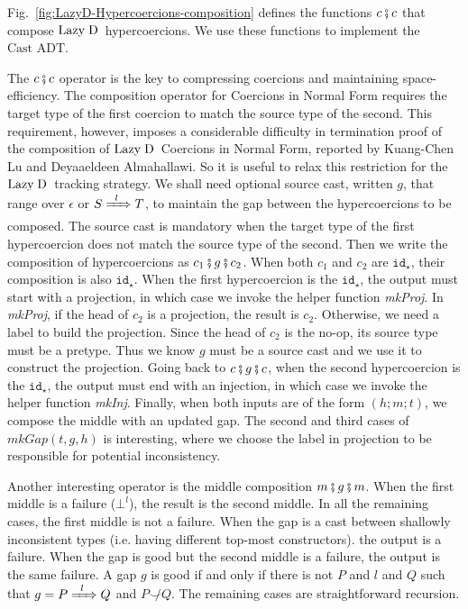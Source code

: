 \documentclass[runningheads]{llncs}
\newcommand{\figref}[1]{Fig.~\ref{#1}}
\newcommand{\LD}{\ensuremath{\text{Lazy\;D}}}
\newcommand{\CastADT}{\ensuremath{\text{Cast ADT}}}
\newcommand{\Tdyn}[0]{\ensuremath{\star}}
\newcommand{\ccast}[3]{#1 \xRightarrow[]{\enskip #2 \enskip} #3}
\newcommand{\cnfid}[1]{\ensuremath{\mathtt{id}_{#1}}}
\newcommand{\hcci}[0]{\cnfid{\Tdyn}}
\newcommand{\hccc}[3]{\ensuremath{(#1;#2;#3)}}
\newcommand{\hcmfail}[1]{\ensuremath{\bot^l}}
\newcommand{\gnone}{\ensuremath{\epsilon}}
\newcommand{\gsome}[3]{\ccast{#1}{#2}{#3}}
\newcommand{\composegap}[3]{\ensuremath{#1 \fatsemi #2 \fatsemi #3}}
\newcommand{\mkgap}[3]{\ensuremath{\mathit{mkGap}(#1,#2,#3)}}
\newcommand{\compose}[2]{\ensuremath{#1 \fatsemi #2}}
\newcommand{\notshallowlyconsistent}[2]{\ensuremath{#1\not\smile#2}}
\begin{document}
\figref{fig:LazyD-Hypercoercions-composition} defines the functions 
\compose{c}{c} that compose \LD\ hypercoercions. We use these functions to 
implement the \CastADT.


The \compose{c}{c} operator is the key to compressing coercions and maintaining 
space-efficiency. The composition operator for Coercions in Normal Form 
requires the target type of the first coercion to match the source type of the 
second. This requirement, however, imposes a considerable difficulty in 
termination proof of the composition of \LD\ Coercions in Normal Form, reported 
by Kuang-Chen Lu and Deyaaeldeen Almahallawi. So it is useful to relax this 
restriction for the \LD\ tracking strategy.
%
We shall need optional source cast, written $g$, that range over
$\gnone$ or $\gsome{S}{l}{T}$, to maintain the gap between the hypercoercions 
to be composed. The source cast is mandatory when the target
type of the first hypercoercion does not match the source type of the second. 
Then we write the composition of hypercoercions as \composegap{c_1}{g}{c_2}.
%  
When both $c_1$ and $c_2$ are \hcci, their composition is also \hcci. 
%
When the first hypercoercion is the \hcci, the output must start with a 
projection, in which case we invoke the helper function \textit{mkProj}. In 
\textit{mkProj}, if the head of $c_2$ is a projection, the result is $c_2$.  
Otherwise, we need a label to build the projection. Since the head of $c_2$ is 
the no-op, its source type must be a pretype. Thus we know $g$ must be a 
source cast and we use it to construct the projection.
%
Going back to $\composegap{c}{g}{c}$, when the second hypercoercion is the 
\hcci, the output must end with an injection, in which case we invoke the 
helper function \textit{mkInj}.
%
Finally, when both inputs are of the form \hccc{h}{m}{t}, we compose the middle 
with an updated gap.
%
The second and third cases of \mkgap{t}{g}{h} is interesting, where we choose 
the label in projection to be responsible for potential inconsistency.

Another interesting operator is the middle composition \composegap{m}{g}{m}. 
%
When the first middle is a failure (\hcmfail{l}), the result is the second
middle. In all the remaining cases, the first middle is not a failure.
%
When the gap is a cast between shallowly inconsistent types (i.e. having 
different top-most constructors). the output is a failure.
%
When the gap is good but the second middle is a failure, the output is the same 
failure. A gap $g$ is good if and only if there is not $P$ and $l$ 
and $Q$ such that $g = \gsome{P}{l}{Q}$ and \notshallowlyconsistent{P}{Q}.
%
The remaining cases are straightforward recursion.
\end{document}
